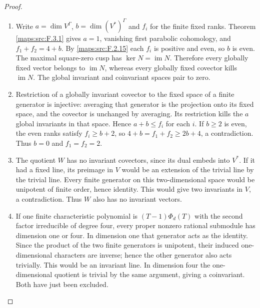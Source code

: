 \begin{proof}
\begin{enumerate}[label=\arabic*.]
\item Write $a=\dim V^\Gamma$, $b=\dim(V^*)^\Gamma$ and $f_i$
for the finite fixed ranks.  Theorem \ref{maps:src:F.3.1} gives $a=1$,
vanishing first parabolic cohomology, and
$f_1+f_2=4+b$.  By \ref{maps:src:F.2.15} each $f_i$ is positive and even, so $b$ is
even.  The maximal square-zero cusp has
$\ker N=\operatorname{im}N$.  Therefore every globally
fixed vector belongs to $\operatorname{im}N$, whereas every
globally fixed covector kills $\operatorname{im}N$.
The global invariant and coinvariant spaces pair to zero.

\item Restriction of a globally invariant covector to the fixed
space of a finite generator is injective: averaging that
generator is the projection onto its fixed space, and the
covector is unchanged by averaging.  Its restriction kills
the $a$ global invariants in that space.  Hence
$a+b\leq f_i$ for each $i$.
If $b\geq2$ is even, the even ranks satisfy
$f_i\geq b+2$, so $4+b=f_1+f_2\geq2b+4$, a contradiction.
Thus $b=0$ and $f_1=f_2=2$.

\item The quotient $W$ has no invariant covectors, since its dual
embeds into $V^*$.  If it had a fixed line, its preimage in
$V$ would be an extension of the trivial line by the trivial
line.  Every finite generator on this two-dimensional
space would be unipotent of finite order, hence identity.
This would give two invariants in $V$, a contradiction.
Thus $W$ also has no invariant vectors.

\item If one finite characteristic polynomial is
$(T-1)\Phi_d(T)$ with the second factor irreducible of degree
four, every proper nonzero rational submodule has dimension
one or four.  In dimension one that generator acts as the
identity.  Since the product of the two finite generators
is unipotent, their induced one-dimensional characters are
inverse; hence the other generator also acts trivially.
This would be an invariant line.  In dimension four the
one-dimensional quotient is trivial by the same argument,
giving a coinvariant.  Both have just been excluded.

\end{enumerate}
\end{proof}


